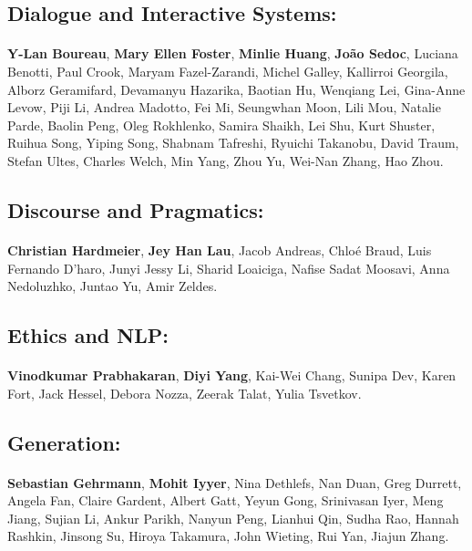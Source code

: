 \subsection*{Dialogue and Interactive Systems:}
\paragraph{}\textbf{Y-Lan Boureau}, \textbf{Mary Ellen Foster}, \textbf{Minlie Huang}, \textbf{João Sedoc}, Luciana Benotti, Paul Crook, Maryam Fazel-Zarandi, Michel Galley, Kallirroi Georgila, Alborz Geramifard, Devamanyu Hazarika, Baotian Hu, Wenqiang Lei, Gina-Anne Levow, Piji Li, Andrea Madotto, Fei Mi, Seungwhan Moon, Lili Mou, Natalie Parde, Baolin Peng, Oleg Rokhlenko, Samira Shaikh, Lei Shu, Kurt Shuster, Ruihua Song, Yiping Song, Shabnam Tafreshi, Ryuichi Takanobu, David Traum, Stefan Ultes, Charles Welch, Min Yang, Zhou Yu, Wei-Nan Zhang, Hao Zhou.
\subsection*{Discourse and Pragmatics:}
\paragraph{}\textbf{Christian Hardmeier}, \textbf{Jey Han Lau}, Jacob Andreas, Chloé Braud, Luis Fernando D'haro, Junyi Jessy Li, Sharid Loaiciga, Nafise Sadat Moosavi, Anna Nedoluzhko, Juntao Yu, Amir Zeldes.
\subsection*{Ethics and NLP:}
\paragraph{}\textbf{Vinodkumar Prabhakaran}, \textbf{Diyi Yang}, Kai-Wei Chang, Sunipa Dev, Karen Fort, Jack Hessel, Debora Nozza, Zeerak Talat, Yulia Tsvetkov.
\subsection*{Generation:}
\paragraph{}\textbf{Sebastian Gehrmann}, \textbf{Mohit Iyyer}, Nina Dethlefs, Nan Duan, Greg Durrett, Angela Fan, Claire Gardent, Albert Gatt, Yeyun Gong, Srinivasan Iyer, Meng Jiang, Sujian Li, Ankur Parikh, Nanyun Peng, Lianhui Qin, Sudha Rao, Hannah Rashkin, Jinsong Su, Hiroya Takamura, John Wieting, Rui Yan, Jiajun Zhang.
